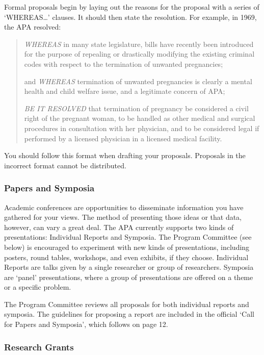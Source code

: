 Formal proposals begin by laying out the reasons for the proposal with a series of `WHEREAS{\ldots}' clauses. It should then state the resolution. For example, in 1969, the APA resolved:

\begin{quote}

\emph{WHEREAS} in many state legislature, bills have recently been introduced for the purpose of repealing or drastically modifying the existing criminal codes with respect to the termination of unwanted pregnancies;

and \emph{WHEREAS} termination of unwanted pregnancies is clearly a mental health and child welfare issue, and a legitimate concern of APA;

\emph{BE IT RESOLVED} that termination of pregnancy be considered a civil right of the pregnant woman, to be handled as other medical and surgical procedures in consultation with her physician, and to be considered legal if performed by a licensed physician in a licensed medical facility.
\end{quote}

You should follow this format when drafting your proposals. Proposals in the incorrect format cannot be distributed.

\subsubsection{Papers and Symposia}
\label{papersandsymposia}

Academic conferences are opportunities to disseminate information you have gathered for your views. The method of presenting those ideas or that data, however, can vary a great deal. The APA currently supports two kinds of presentations: Individual Reports and Symposia. The Program Committee (see below) is encouraged to experiment with new kinds of presentations, including posters, round tables, workshops, and even exhibits, if they choose. Individual Reports are talks given by a single researcher or group of researchers. Symposia are `panel' presentations, where a group of presentations are offered on a theme or a specific problem.

The Program Committee reviews all proposals for both individual reports and symposia. The guidelines for proposing a report are included in the official `Call for Papers and Symposia', which follows on page 12.

\subsubsection{Research Grants}
\label{researchgrants}

